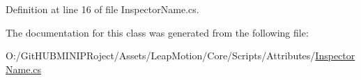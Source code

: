 Definition at line 16 of file Inspector\+Name.\+cs.



The documentation for this class was generated from the following file\+:\begin{DoxyCompactItemize}
\item 
O\+:/\+Git\+H\+U\+B\+M\+I\+N\+I\+P\+Roject/\+Assets/\+Leap\+Motion/\+Core/\+Scripts/\+Attributes/\mbox{\hyperlink{_inspector_name_8cs}{Inspector\+Name.\+cs}}\end{DoxyCompactItemize}
